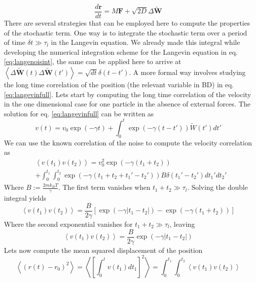 \documentclass[ twoside,openright,titlepage,numbers=noenddot,%
headinclude,footinclude,cleardoublepage=empty,abstract=on,
BCOR=5mm,paper=a4,fontsize=11pt, dvipsnames
]{scrreprt}
\renewcommand{\vec}[1]{\bm{#1}}
\newcommand{\dt}{\delta t}
\newcommand{\kT}{k_B T}
\begin{document}
\begin{equation}
  \label{eq:bdlange2}
  \frac{d\vec{r}}{dt} = M\vec{F} + \sqrt{2D}\Delta\vec{\widetilde{W}}
\end{equation}
There are several strategies that can be employed here to compute the properties of the stochastic term. One way is to integrate the stochastic term over a period of time $\dt\gg\tau_l$ in the Langevin equation. We already made this integral while developing the numerical integration scheme for the Langevin equation in eq. \eqref{eq:langenoisint}, the same can be applied here to arrive at $\left\langle\Delta\vec{\widetilde{W}}(t)\Delta\vec{\widetilde{W}}(t')\right\rangle = \sqrt{dt}\delta(t-t')$.
A more formal way involves studying the long time correlation of the position (the relevant variable in \gls{BD}) in eq. \eqref{eq:langevinfull}. Lets start by computing the long time correlation of the velocity in the one dimensional case for one particle in the absence of external forces.
The solution for eq. \eqref{eq:langevinfull} can be written as
\begin{equation}
  v(t) = v_0\exp(-\gamma t) + \int_0^t\exp(-\gamma(t-t'))\widetilde{W}(t')dt'
\end{equation}
We can use the known correlation of the noise to compute the velocity correlation as
\begin{equation}
  \begin{aligned}
&  \left\langle v(t_1)v(t_2)\right\rangle = v_0^2\exp(-\gamma(t_1+t_2)) \\
  &+\int_0^{t_1}{\int_0^{t_2}{\exp(-\gamma(t_1+t_2+t_1'-t_2'))B\delta(t_1'-t_2')dt_1'dt_2'}}
\end{aligned}
\end{equation}
Where $B :=\frac{2m\kT}{\gamma}$.
The first term vanishes when $t_1 +t_2 \gg \tau_l$.
Solving the double integral yields
\begin{equation}
  \left\langle v(t_1)v(t_2)\right\rangle = \frac{B}{2\gamma}\left[\exp(-\gamma|t_1-t_2|)-\exp(-\gamma(t_1+t_2))\right]
\end{equation}
Where the second exponential vanishes for $t_1 +t_2 \gg \tau_l$, leaving
\begin{equation}
  \left\langle v(t_1)v(t_2)\right\rangle = \frac{B}{2\gamma}\exp(-\gamma|t_1-t_2|)
\end{equation}
Lets now compute the mean squared displacement of the position
\begin{equation}
  \left\langle(r(t) - r_0)^2 \right\rangle = \left\langle\left[ \int_0^{t}v(t_1)dt_1 \right]^2 \right\rangle = \int_0^{t_1}{\int_0^{t_2}{\left\langle v(t_1)v(t_2)\right\rangle}}
\end{equation}
\end{document}
